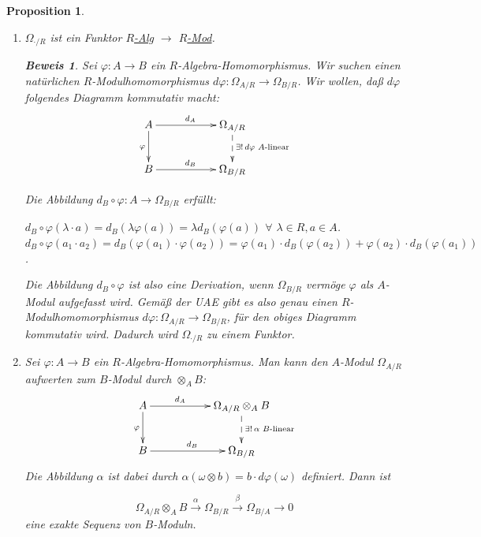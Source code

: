 \documentclass[a4paper,12pt]{scrbook}
\theoremstyle{break}
\newtheorem{Prop}[Def]{Proposition}
\theoremstyle{nonumberbreak}
\newtheorem{Bew}{Beweis}
\theoremstyle{nonumberplain}
\begin{document}
\begin{Prop}
\begin{enumerate}
\item[a)]
$\Omega_{\cdot/R}$ ist ein Funktor \underline{$R$-Alg} $\rightarrow$ \underline{$R$-Mod}.

\begin{Bew}
Sei $\varphi: A \rightarrow B$ ein $R$-Algebra-Homomorphismus. Wir suchen einen natürlichen $R$-Modulhomomorphismus $d\varphi : \Omega_{A/R} \to \Omega_{B/R}$.
Wir wollen, daß $d\varphi$ folgendes Diagramm kommutativ macht:
$$
\begin{xy}
\xymatrix{
A \ar[rr]^{d_A} \ar[d]_{\varphi} & & \ar@{-->}[d]^{\exists!\, d\varphi \text{ $A$-linear}} \Omega_{A/R} \\
B \ar[rr]^{d_B}                  & & \Omega_{B/R}
}
\end{xy}
$$

Die Abbildung $d_B \circ \varphi : A \rightarrow \Omega_{B/R}$ erfüllt:

$d_B \circ \varphi(\lambda \cdot a) = d_B(\lambda \varphi(a)) = \lambda d_B(\varphi(a))$ $\forall$ $\lambda \in R, a \in A$.\\
$d_B \circ \varphi(a_1 \cdot a_2) = d_B(\varphi(a_1) \cdot \varphi(a_2)) = \varphi(a_1) \cdot d_B(\varphi(a_2)) + \varphi(a_2) \cdot d_B(\varphi(a_1))$.

Die Abbildung $d_B \circ \varphi$ ist also eine Derivation, wenn $\Omega_{B/R}$ vermöge $\varphi$ als $A$-Modul aufgefasst wird. Gemäß der UAE gibt es also genau einen $R$-Modulhomomorphismus $d\varphi : \Omega_{A/R} \to \Omega_{B/R}$, für den obiges Diagramm kommutativ wird. Dadurch wird $\Omega_{\cdot /R}$ zu einem Funktor.
\end{Bew}

\item[b)] Sei $\varphi: A \rightarrow B$ ein $R$-Algebra-Homomorphismus. 
Man kann den $A$-Modul $\Omega_{A/R}$ aufwerten zum $B$-Modul durch $\otimes_A B$:
$$
\begin{xy}
\xymatrix{
A \ar[rr]^-{d_A} \ar[d]_{\varphi}  & & \ar@{-->}[d]^{\exists!\, \alpha \text{ $B$-linear}} \Omega_{A/R} \otimes_A B \\
B \ar[rr]^{d_B}                   & & \Omega_{B/R}
}
\end{xy}
$$
Die Abbildung $\alpha$ ist dabei durch $\alpha\left(\omega \otimes b\right) = b \cdot d\varphi(\omega)$ definiert. Dann ist

$$\Omega_{A/R} \otimes_A B \overset{\alpha}{\rightarrow} \Omega_{B/R} \overset{\beta}{\rightarrow} \Omega_{B/A} \rightarrow 0$$
eine exakte Sequenz von $B$-Moduln.


\end{enumerate}
\end{Prop}
\end{document}
